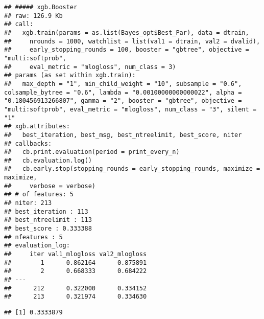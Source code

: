 \documentclass[]{article}
\newenvironment{Shaded}{\begin{snugshade}}{\end{snugshade}}
\newcommand{\CommentTok}[1]{\textcolor[rgb]{0.56,0.35,0.01}{\textit{#1}}}
\newcommand{\DataTypeTok}[1]{\textcolor[rgb]{0.13,0.29,0.53}{#1}}
\newcommand{\KeywordTok}[1]{\textcolor[rgb]{0.13,0.29,0.53}{\textbf{#1}}}
\newcommand{\NormalTok}[1]{#1}
\newcommand{\OperatorTok}[1]{\textcolor[rgb]{0.81,0.36,0.00}{\textbf{#1}}}
\newcommand{\StringTok}[1]{\textcolor[rgb]{0.31,0.60,0.02}{#1}}
\begin{document}
\begin{verbatim}
## ##### xgb.Booster
## raw: 126.9 Kb 
## call:
##   xgb.train(params = as.list(Bayes_opt$Best_Par), data = dtrain, 
##     nrounds = 1000, watchlist = list(val1 = dtrain, val2 = dvalid), 
##     early_stopping_rounds = 100, booster = "gbtree", objective = "multi:softprob", 
##     eval_metric = "mlogloss", num_class = 3)
## params (as set within xgb.train):
##   max_depth = "1", min_child_weight = "10", subsample = "0.6", colsample_bytree = "0.6", lambda = "0.00100000000000022", alpha = "0.180456913266807", gamma = "2", booster = "gbtree", objective = "multi:softprob", eval_metric = "mlogloss", num_class = "3", silent = "1"
## xgb.attributes:
##   best_iteration, best_msg, best_ntreelimit, best_score, niter
## callbacks:
##   cb.print.evaluation(period = print_every_n)
##   cb.evaluation.log()
##   cb.early.stop(stopping_rounds = early_stopping_rounds, maximize = maximize, 
##     verbose = verbose)
## # of features: 5 
## niter: 213
## best_iteration : 113 
## best_ntreelimit : 113 
## best_score : 0.333388 
## nfeatures : 5 
## evaluation_log:
##     iter val1_mlogloss val2_mlogloss
##        1      0.862164      0.875891
##        2      0.668333      0.684222
## ---                                 
##      212      0.322000      0.334152
##      213      0.321974      0.334630
\end{verbatim}

\begin{Shaded}
\end{Shaded}

\begin{verbatim}
## [1] 0.3333879
\end{verbatim}
\end{document}
